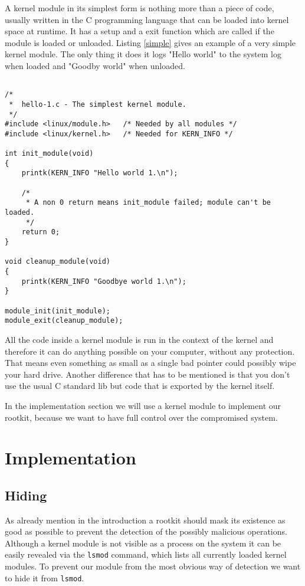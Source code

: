 \documentclass[12pt]{article}
\newcommand{\shellcmdinline}[1]{\texttt{\footnotesize #1}}
\begin{document}
A kernel module in its simplest form is nothing more than a piece of code, usually written in the C programming language that can be loaded into kernel space at runtime. It has a setup and a exit function which are called if the module is loaded or unloaded. Listing \ref{simple} gives an example of a very simple kernel module. The only thing it does it logs "Hello world" to the system log when loaded and "Goodby world" when unloaded.

\begin{lstlisting}[caption=Source: \url{http://www.tldp.org/LDP/lkmpg/2.6/html/x121.html}., label=simple]

/*  
 *  hello-1.c - The simplest kernel module.
 */
#include <linux/module.h>	/* Needed by all modules */
#include <linux/kernel.h>	/* Needed for KERN_INFO */

int init_module(void)
{
	printk(KERN_INFO "Hello world 1.\n");

	/* 
	 * A non 0 return means init_module failed; module can't be loaded. 
	 */
	return 0;
}

void cleanup_module(void)
{
	printk(KERN_INFO "Goodbye world 1.\n");
}

module_init(init_module);
module_exit(cleanup_module);

\end{lstlisting}

All the code inside a kernel module is run in the context of the kernel and therefore it can do anything possible on your computer, without any protection. That means even something as small as a single bad pointer could possibly wipe your hard drive. Another difference that has to be mentioned is that you don't use the usual C standard lib but code that is exported by the kernel itself. 

In the implementation section we will use a kernel module to implement our rootkit, because we want to have full control over the compromised system.
\newpage
\section{Implementation}
\label{sec:impl}

\subsection{Hiding}
As already mention in the introduction a rootkit should mask its existence as good as possible to prevent the detection of the possibly malicious operations. Although a kernel module is not visible as a process on the system it can be easily revealed via the \shellcmdinline{lsmod} command, which lists all currently loaded kernel modules. To prevent our module from the most obvious way of detection we want to hide it from \shellcmdinline{lsmod}. 
\end{document}
